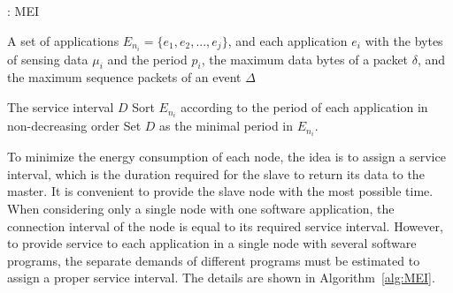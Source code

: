 \documentclass[10pt,journal,compsoc]{IEEEtran}
\newcommand{\algorithmicinput}{\textbf{Input:}}
\newcommand{\INPUT}{\item[\algorithmicinput]}
\newcommand{\algorithmicoutput}{\textbf{Output:}}
\newcommand{\OUTPUT}{\item[\algorithmicoutput]}
\begin{document}
\begin{algorithm}[h!]
  \caption{: MEI}
  \label{alg:MEI}
  \begin{algorithmic}[1]
   \INPUT
    A set of applications $E_{n_i}=\{e_1, e_2,..., e_j\}$, and each application $e_i$ with the bytes of sensing data $\mu_i$ and the period $p_i$, the maximum data bytes of a packet $\delta$, and the maximum sequence packets of an event $\Delta$
   \OUTPUT
        The service interval $D$
       \State Sort $E_{n_i}$ according to the period of each application in non-decreasing order
       \State Set $D$ as the minimal period in $E_{n_i}$.
            \EndWhile
        \EndWhile
\end{algorithmic}
\end{algorithm}


To minimize the energy consumption of each node, the idea is to assign a service interval, which is the duration required for the slave to return its data to the master. It is convenient to provide the slave node with the most possible time. When considering only a single node with one software application, the connection interval of the node is equal to its required service interval. However, to provide service to each application in a single node with several software programs, the separate demands of different programs must be estimated to assign a proper service interval. The details are shown in Algorithm~\ref{alg:MEI}.
\end{document}
